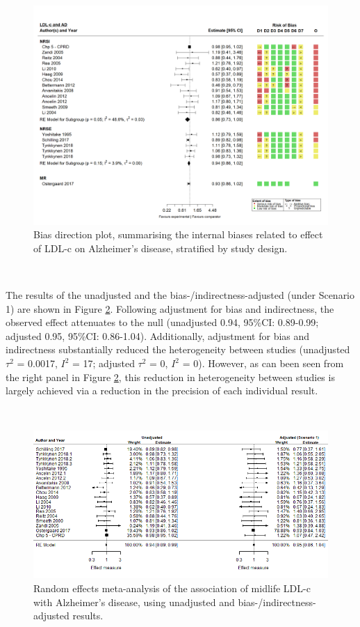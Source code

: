 \documentclass[a4paper, twoside]{templates/ociamthesis}
\begin{document}
\begin{figure}[H]
\includegraphics[width=1\linewidth]{figures/tri/midlife_AD} \caption[Bias direction plot, summarising internal biases]{Bias direction plot, summarising the internal biases related to effect of LDL-c on Alzheimer's disease, stratified by study design.}\label{fig:ldlAdBiasDirection}
\end{figure}

~

The results of the unadjusted and the bias-/indirectness-adjusted (under Scenario 1) are shown in Figure \ref{fig:fpLdlAd}. Following adjustment for bias and indirectness, the observed effect attenuates to the null (unadjusted 0.94, 95\%CI: 0.89-0.99; adjusted 0.95, 95\%CI: 0.86-1.04). Additionally, adjustment for bias and indirectness substantially reduced the heterogeneity between studies (unadjusted \(\tau^2\) = 0.0017, \(I^2\) = 17; adjusted \(\tau^2\) = 0, \(I^2\) = 0). However, as can been seen from the right panel in Figure \ref{fig:fpLdlAd}, this reduction in heterogeneity between studies is largely achieved via a reduction in the precision of each individual result.

~





\begin{figure}[H]
\includegraphics[width=1\linewidth]{figures/tri/fp_paired_midlife_ldl_ad} \caption[Random effects meta-analysis using unadjusted and bias-/indirectness-adjusted results.]{Random effects meta-analysis of the association of midlife LDL-c with Alzheimer's disease, using unadjusted and bias-/indirectness-adjusted results.}\label{fig:fpLdlAd}
\end{figure}
\end{document}
